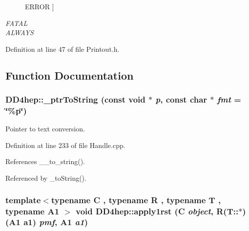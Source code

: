\begin{Desc}
\begin{description}
{{ERROR}
\label{namespace_d_d4hep_a5b5a64d56252469451f2020a27d57d42a54d5c1b9254fdf017c456cb972d26f96}
}]\item[{\em 
\hypertarget{namespace_d_d4hep_a5b5a64d56252469451f2020a27d57d42a7bfb778cde0373aa4be752e638d8383b}{
FATAL}
\label{namespace_d_d4hep_a5b5a64d56252469451f2020a27d57d42a7bfb778cde0373aa4be752e638d8383b}
}]\item[{\em 
\hypertarget{namespace_d_d4hep_a5b5a64d56252469451f2020a27d57d42a918099d24909b9384ac28d377dbf58f1}{
ALWAYS}
\label{namespace_d_d4hep_a5b5a64d56252469451f2020a27d57d42a918099d24909b9384ac28d377dbf58f1}
}]\end{description}
\end{Desc}



Definition at line 47 of file Printout.h.

\subsection{Function Documentation}
\hypertarget{namespace_d_d4hep_a33a5015e65029bf1f0908946fa049550}{
\subsubsection[{\_\-ptrToString}]{ DD4hep::\_\-ptrToString (const void $\ast$ {\em p}, \/  const char $\ast$ {\em fmt} = {\ttfamily \char`\"{}\%p\char`\"{}})}}
\label{namespace_d_d4hep_a33a5015e65029bf1f0908946fa049550}


Pointer to text conversion. 

Definition at line 233 of file Handle.cpp.

References \_\-\_\-to\_\-string().

Referenced by \_\-toString().\hypertarget{namespace_d_d4hep_a92f3e4b39b13f1f5808f22cda1740449}{
\subsubsection[{apply1rst}]{\setlength{\rightskip}{0pt plus 5cm}template$<$typename C , typename R , typename T , typename A1 $>$ void DD4hep::apply1rst (C {\em object}, \/  R(T::$\ast$)(A1 a1) {\em pmf}, \/  A1 {\em a1})}}
\label{namespace_d_d4hep_a92f3e4b39b13f1f5808f22cda1740449}


